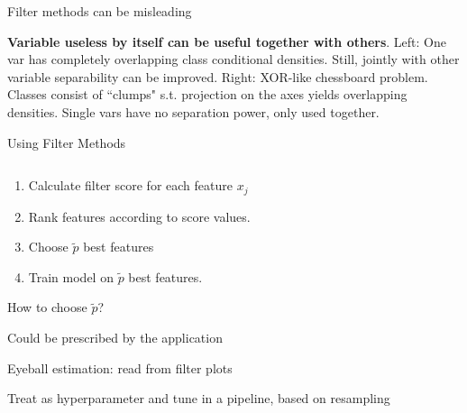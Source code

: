 \documentclass[11pt,compress,t,notes=noshow, xcolor=table]{beamer}
\begin{document}
\begin{vbframe}{Filter methods can be misleading}
\begin{figure}
\begin{minipage}{0.45\textwidth}
    \end{minipage}
    \end{figure}
\vspace{0.3cm}
\footnotesize{\textbf{Variable useless by itself can be useful together with others}. Left: One var has completely overlapping class conditional densities. Still, jointly with other variable separability can be improved. Right: XOR-like chessboard problem. Classes consist of ``clumps" s.t. projection on the axes yields overlapping densities. Single vars have no separation power, only used together.}


\end{vbframe}

\begin{vbframe}{Using Filter Methods}



  \begin{columns}
    \begin{column}{0.65\textwidth}
      \begin{enumerate}{}
        \setlength{\itemsep}{1.2em}
          \item Calculate filter score for each feature $x_j$
          \item Rank features according to score values.
          \item Choose $\tilde{p}$ best features
          \item Train model on $\tilde{p}$ best features.
        \end{enumerate}

        \begin{blocki}{How to choose $\tilde{p}$?}
          \item Could be prescribed by the application
          \item Eyeball estimation: read from filter plots
          \item Treat as hyperparameter and tune in a pipeline, based on resampling
        \end{blocki}
    \end{column}


\end{columns}
\end{vbframe}
\end{document}
